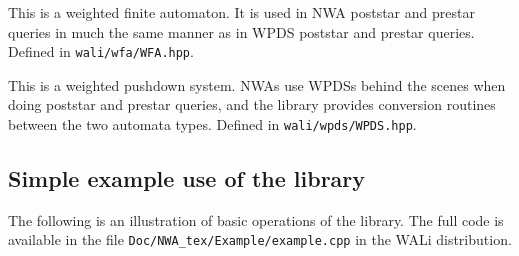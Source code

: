 \begin{functionlist}
   This is a weighted finite automaton. It is
    used in NWA poststar and prestar queries in much the same manner as in
    WPDS poststar and prestar queries. Defined in \texttt{wali/wfa/WFA.hpp}.

   This is a weighted pushdown system. NWAs use
    WPDSs behind the scenes when doing poststar and prestar queries, and the
    library provides conversion routines between the two automata
    types. Defined in \texttt{wali/wpds/WPDS.hpp}.
\end{functionlist}


\subsection{Simple example use of the library}
\label{Se:ExampleUse}
The following is an illustration of basic operations of the library. The full
code is available in the file \texttt{Doc/NWA\_tex/Example/example.cpp} in the
WALi distribution.

\inputminted{c++}{Example/example-abbrev.cpp}

